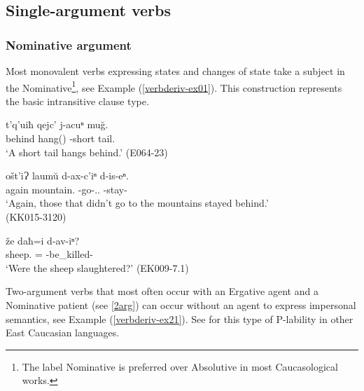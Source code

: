 \subsection{Single-argument verbs} \label{1arg}

\subsubsection{Nominative argument}

Most monovalent verbs expressing states and changes of state take a subject in the Nominative\footnote{The label Nominative is preferred over Absolutive in most Caucasological works.}, see Example (\ref{verbderiv-ex01}). This construction represents the basic intransitive clause type.

\begin{exe}
	\ex\label{verbderiv-ex01}
	\begin{xlist}
		
		
			\ex\label{verbderiv-ex01a}
			\gll t'q'uiħ qejc' j-acuⁿ mu\u{g}. \\
			behind hang({\Npst}) {\J}-short tail.\textbf{{\Nom}} \\
			\trans `A short tail hangs behind.'
			\hfill (E064-23)
		
		
		
			\ex\label{verbderiv-ex01b}
			\gll ošt'iɁ laum\u{u} d-ax-c'iⁿ d-is-eⁿ.  \\
			again mountain.{\Lat} {\D}-go-{\Priv}.{\Adjz}.\textbf{{\Nom}} {\D}-stay-{\Aor} \\
			\trans `Again, those that didn't go to the mountains stayed behind.' \\
			\hfill (KK015-3120)
		
		
		
			\ex\label{verbderiv-ex01c}
			\gll že daħ=i d-av-iⁿ? \\
			sheep.\textbf{{\Nom}} {\Pv}={\Q} {\D}-be\_killed-{\Aor} \\
			\trans `Were the sheep slaughtered?'
			\hfill (EK009-7.1)
		
		
	\end{xlist}
\end{exe}



Two-argument verbs that most often occur with an Ergative agent and a Nominative patient (see \ref{2arg}) can occur without an agent to express impersonal semantics, see Example (\ref{verbderiv-ex21}). See \textcite{creissels14labile,forker17ergativity} for this type of P-lability in other East Caucasian languages.\largerpage

